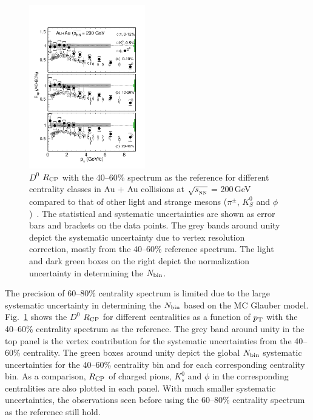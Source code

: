 \documentclass[%
 reprint,	
 amsmath,amssymb,
 aps,
 prc,
]{revtex4-1}
\begin{document}
\begin{figure}
\centering
\includegraphics[width=0.45\textwidth]{fig/D0_Rcp2.pdf}
\caption{$D^{0}$ $R_{\rm CP}$ with the 40--60\% spectrum as the reference for different centrality classes in Au + Au collisions at $\sqrt{s_{_{\rm NN}}}$ = 200\,GeV compared to that of other light and strange mesons ($\pi^{\pm}$, $K^0_{S}$ and $\phi$)~\cite{Adams2006_Identified,Abelev2009,Agakishiev2012}. The statistical and systematic uncertainties are shown as error bars and brackets on the data points. The grey bands around unity depict the systematic uncertainty due to vertex resolution correction, mostly from the 40--60\% reference spectrum. The light and dark green boxes on the right depict the normalization uncertainty in determining the $N_{\rm bin}$.}
\label{fig:D0_Rcp2} 
\end{figure}

The precision of 60--80\% centrality spectrum is limited due to the large systematic uncertainty in determining the $N_{\rm bin}$ based on the MC Glauber model. Fig.~\ref{fig:D0_Rcp2} shows the $D^0$ $R_{\rm CP}$ for different centralities as a function of $p_{\rm T}$ with the 40--60\% centrality spectrum as the reference. The grey band around unity in the top panel is the vertex contribution for the systematic uncertainties from the 40--60\% centrality. The green boxes around unity depict the global $N_{\rm bin}$ systematic uncertainties for the 40--60\% centrality bin and for each corresponding centrality bin. As a comparison, $R_{\rm CP}$ of charged pions, $K_{s}^{0}$ and $\phi$ in the corresponding centralities are also plotted in each panel. With much smaller systematic uncertainties, the observations seen before using the 60--80\% centrality spectrum as the reference still hold. 
\end{document}
